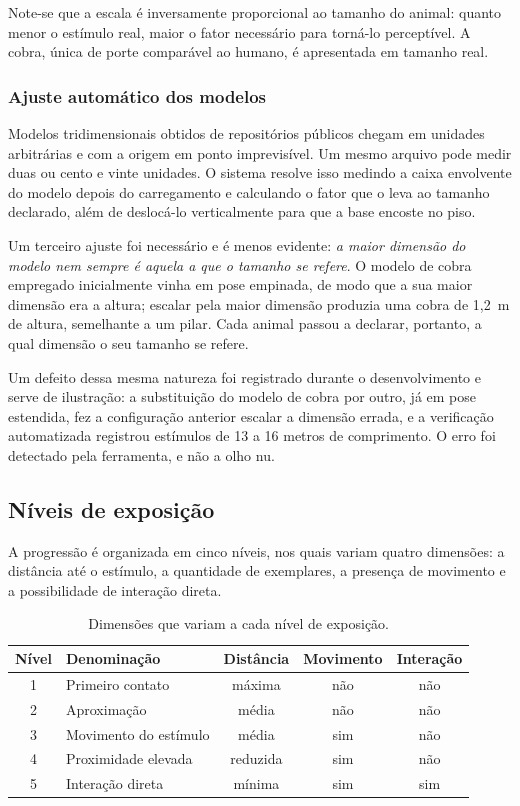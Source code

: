 Note-se que a escala é inversamente proporcional ao tamanho do animal:
quanto menor o estímulo real, maior o fator necessário para torná-lo
perceptível. A cobra, única de porte comparável ao humano, é apresentada
em tamanho real.

\subsubsection{Ajuste automático dos modelos}

Modelos tridimensionais obtidos de repositórios públicos chegam em
unidades arbitrárias e com a origem em ponto imprevisível. Um mesmo
arquivo pode medir duas ou cento e vinte unidades. O sistema resolve isso
medindo a caixa envolvente do modelo depois do carregamento e calculando
o fator que o leva ao tamanho declarado, além de deslocá-lo
verticalmente para que a base encoste no piso.

Um terceiro ajuste foi necessário e é menos evidente: \emph{a maior
dimensão do modelo nem sempre é aquela a que o tamanho se refere}. O
modelo de cobra empregado inicialmente vinha em pose empinada, de modo
que a sua maior dimensão era a altura; escalar pela maior dimensão
produzia uma cobra de 1,2~m de altura, semelhante a um pilar. Cada animal
passou a declarar, portanto, a qual dimensão o seu tamanho se refere.

Um defeito dessa mesma natureza foi registrado durante o
desenvolvimento e serve de ilustração: a substituição do modelo de cobra
por outro, já em pose estendida, fez a configuração anterior escalar a
dimensão errada, e a verificação automatizada registrou estímulos de 13 a
16 metros de comprimento. O erro foi detectado pela ferramenta, e não a
olho nu.

\subsection{Níveis de exposição}

A progressão é organizada em cinco níveis, nos quais variam quatro
dimensões: a distância até o estímulo, a quantidade de exemplares, a
presença de movimento e a possibilidade de interação direta.

\begin{table}[htbp]
\centering
\caption{Dimensões que variam a cada nível de exposição.}
\label{tab:niveis}
\begin{tabular}{clccc}
\toprule
\textbf{Nível} & \textbf{Denominação} & \textbf{Distância} & \textbf{Movimento} & \textbf{Interação} \\
\midrule
1 & Primeiro contato      & máxima    & não & não \\
2 & Aproximação           & média     & não & não \\
3 & Movimento do estímulo & média     & sim & não \\
4 & Proximidade elevada   & reduzida  & sim & não \\
5 & Interação direta      & mínima    & sim & sim \\
\bottomrule
\end{tabular}
\end{table}

